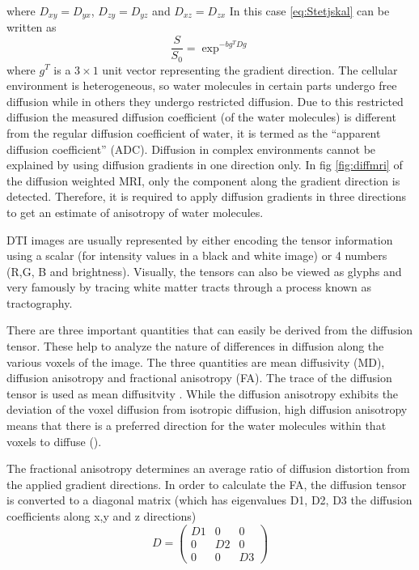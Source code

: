 \documentclass[msthesis.tex]{subfiles}
\begin{document}
where $D_{xy} = D_{yx}$, $D_{zy}=D_{yz}$ and $D_{xz}=D_{zx}$
In this case \autoref{eq:Stetjskal} can be written as 
\begin{equation}
\frac{S}{S_0} = \exp^{-bg^T Dg}
\end{equation}where $g^T$ is a $3 \times 1$ unit vector representing the gradient direction.
The cellular environment is heterogeneous, so water molecules in certain parts undergo free diffusion while in others they undergo restricted diffusion. Due to this restricted diffusion the measured diffusion coefficient (of the water molecules) is different from the regular diffusion coefficient of water, it is termed as the “apparent diffusion coefficient” (ADC). Diffusion in complex environments cannot be explained by using diffusion gradients in one direction only. In fig \autoref{fig:diffmri} of the diffusion weighted MRI, only the component along the gradient direction is detected. Therefore, it is required to apply diffusion gradients in three directions to get an estimate of anisotropy of water molecules. 

DTI images are usually represented by either encoding the tensor information using a scalar (for intensity values in a black and white image) or 4 numbers (R,G, B and brightness). Visually, the tensors can also be viewed as glyphs and very famously by tracing white matter tracts through a process known as tractography.

There are three important quantities that can easily be derived from the diffusion tensor. These help to analyze the nature of differences in diffusion along the various voxels of the image. The three quantities are mean diffusivity (MD), diffusion anisotropy and fractional anisotropy (FA). The trace of the diffusion tensor is used as mean diffusitvity . While the diffusion anisotropy exhibits the deviation of the voxel diffusion from isotropic diffusion, high diffusion anisotropy means that there is a preferred direction for the water molecules within that voxels to diffuse (\cite{clark2011mean}). 

The fractional anisotropy determines an average ratio of diffusion distortion from the applied gradient directions. In order to calculate the FA, the diffusion tensor is converted to a diagonal matrix (which has eigenvalues D1, D2, D3 the diffusion coefficients along x,y and z directions) \\
\begin{equation*}
D =
 \begin{pmatrix}
D1 & 0 & 0 \\
0 & D2 & 0 \\
0 & 0 & D3
\end{pmatrix}   
\end{equation*}
\end{document}

